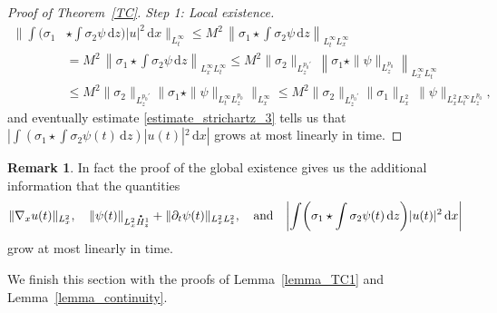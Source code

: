 \documentclass[JEP,XML,SOM,NoEqCountersInSection,NoFloatCountersInSection,Unicode,published]{cedram}
\theoremstyle{definition}
\newtheorem{rmk}[lemma]{Remark}
\newcommand*{\overbigdot}[1]{%
\accentset{\mbox{\large\bfseries .}}{#1}}
\newenvironment{ProofOf}[1]{\begin{proof}[Proof of #1]}{\end{proof}}
\newcommand{\ud}{\, {\mathrm{d}}}
\begin{document}
\begin{ProofOf}{Theorem~\ref{TC}. Step 1: Local existence}
\begin{equation}
\begin{split}
\biggl\|\int(\sigma_{1}&\star\int\sigma_{2}\psi\ud z)|u|^{2}\ud x\biggr\|_{L_{t}^{\infty}}\leq M^{2}\,\left\|\sigma_{1}\star\int\sigma_{2}\psi\ud z\right\|_{L_{t}^{\infty}L_{x}^{\infty}}\\
&=M^{2}\,\left\|\sigma_{1}\star\int\sigma_{2}\psi\ud z\right\|_{L_{x}^{\infty}L_{t}^{\infty}}\leq M^{2}\|\sigma_{2}\|_{L_{z}^{p_{0}'}}\,\left\|\sigma_{1}\star\|\psi\|_{L_{z}^{p_{0}}}\right\|_{L_{x}^{\infty}L_{t}^{\infty}}\\
&\leq M^{2}\|\sigma_{2}\|_{L_{z}^{p_{0}'}}\bigl\|\sigma_{1}\star\|\psi\|_{L_{t}^{\infty}L_{z}^{p_{0}}}\bigr\|_{L_{x}^{\infty}}\leq M^{2}\|\sigma_{2}\|_{L_{z}^{p_{0}'}}\|\sigma_{1}\|_{L_{x}^{2}}\,\|\psi\|_{L_{x}^{2}L_{t}^{\infty}L_{z}^{p_{0}}},
\end{split}
\end{equation}
and eventually estimate \eqref{estimate_strichartz_3} tells us that $|\int(\sigma_{1}\star\int\sigma_{2}\psi(t)\ud z)|u(t)|^{2}\ud x|$ grows at most linearly in time.
\end{ProofOf}

\begin{rmk}
In fact the proof of the global existence gives us the additional information that the quantities
\[
\|\nabla_{x}u(t)\|_{L_{x}^{2}},\quad \|\psi(t)\|_{L_{x}^{2}\overbigdot{H}_{z}^{1}}+\|\partial_{t}\psi(t)\|_{L_{x}^{2}L_{z}^{2}},\quad\text{and}\quad
\biggl|\int\biggl(\sigma_{1}\star\int\sigma_{2}\psi(t)\ud z\biggr)|u(t)|^{2}\ud x\biggr|
\]
grow at most linearly in time.
\end{rmk}

We finish this section with the proofs of Lemma~\ref{lemma_TC1} and Lemma~\ref{lemma_continuity}.
\end{document}
